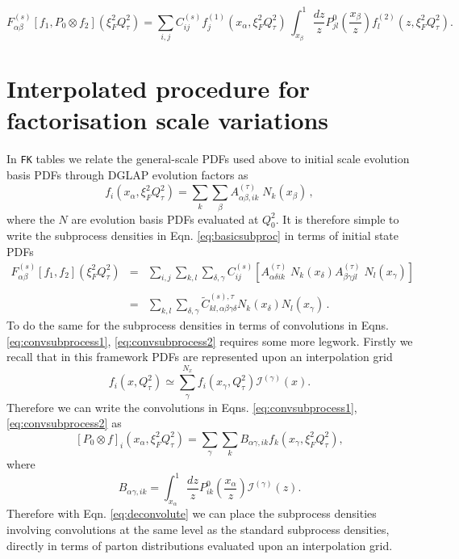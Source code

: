 \documentclass[11pt]{article}
\newcommand{\be}{\begin{equation}}
\newcommand{\ee}{\end{equation}}
\begin{document}
\be \label{eq:convsubprocess2} F^{(s)}_{\alpha\beta}[f_1, P_0\otimes f_2](\xi_F^2{Q^2_\tau})=\sum_{i,j} C^{(s)}_{ij} 
 f_j^{(1)}(x_{\alpha},\xi_F^2Q^2_\tau)\,  \int_{x_\beta}^1 \frac{dz}{z}P^0_{jl}\left(\frac{x_\beta}{z}\right)f^{(2)}_l(z,\xi_F^2Q^2_\tau). \ee
\section{Interpolated procedure for factorisation scale variations}
In {\tt FK} tables we relate the general-scale PDFs used above to initial scale evolution basis PDFs through DGLAP evolution factors as
\begin{equation}\label{eq:fastPDFfinal_recalled}
  f_i(x_{\alpha},\xi_F^2Q^2_\tau) = \sum_{k}
  \sum_\beta A^{(\tau)}_{\alpha\beta, ik}\;
  N_k(x_\beta)\,, 
\end{equation}
where the $N$ are evolution basis PDFs evaluated at $Q_0^2$. It is therefore simple to write the subprocess densities in Eqn. \ref{eq:basicsubproc} in terms of initial state PDFs
\begin{equation}\label{eq:FK1}
\begin{array}{rcl}
F^{(s)}_{\alpha\beta}[f_1, f_2](\xi_F^2Q^2_\tau) &=&  \displaystyle \sum_{i,j} \sum_{k,l}
                               \sum_{\delta,\gamma} C^{(s)}_{ij}
                               \left[  A^{(\tau)}_{\alpha\delta ik}\;
                               N_k(x_\delta) A^{(\tau)}_{\beta\gamma
                               jl}\; N_l(x_\gamma) \right]\;\;\;
  \\
\\
&=& \displaystyle \sum_{k,l}\sum_{\delta,\gamma}
\widetilde{C}^{(s),\tau}_{kl,\alpha\beta\gamma\delta}
N_k(x_\delta) N_l(x_\gamma)\,.
\end{array}
\end{equation}
To do the same for the subprocess densities in terms of convolutions in Eqns. \ref{eq:convsubprocess1}, \ref{eq:convsubprocess2} requires some more legwork.
Firstly we recall that in this framework PDFs are represented upon an interpolation grid
\be f_i(x,Q_\tau^2) \simeq \sum_\gamma^{N_x} f_i(x_\gamma, Q_\tau^2)\mathcal{I}^{(\gamma)}(x).\ee
Therefore we can write the convolutions in Eqns. \ref{eq:convsubprocess1}, \ref{eq:convsubprocess2} as
\be \label{eq:deconvolute} \left[P_0\otimes f\right]_{i}(x_\alpha,  \xi_F^2Q_\tau^2) = \sum_\gamma \sum_k B_{\alpha\gamma, ik} f_k(x_\gamma, \xi_F^2Q_\tau^2),\ee
where
\be B_{\alpha\gamma, ik} = \int_{x_\alpha}^1 \frac{dz}{z} P_{ik}^0\left(\frac{x_\alpha}{z}\right)\mathcal{I}^{(\gamma)}(z).\ee
Therefore with Eqn. \ref{eq:deconvolute} we can place the subprocess densities involving convolutions at the same level as the standard subprocess densities, directly in terms of parton distributions evaluated upon an interpolation grid.
\end{document}
